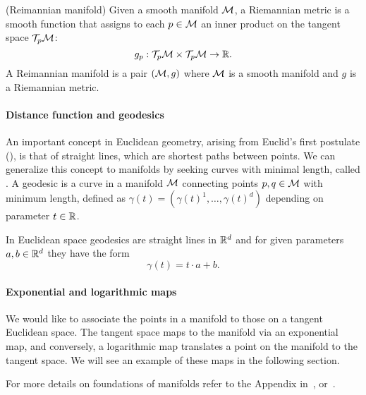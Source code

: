 \begin{definition} (Reimannian manifold)
Given a smooth manifold $\mathcal{M}$, a Riemannian metric is a smooth function that assigns to each $p \in \mathcal{M}$ an inner product on the tangent space $\mathcal{T}_p\mathcal{M}$:
\begin{equation*}
    g_p: \mathcal{T}_p\mathcal{M} \times \mathcal{T}_p\mathcal{M} \to \mathbb{R}.
\end{equation*}
    A Reimannian manifold is a pair $(\mathcal{M},g)$ where $\mathcal{M}$ is a smooth manifold and $g$ is a Riemannian metric.
\end{definition}



\paragraph{Distance function and geodesics} An important concept in Euclidean geometry, arising from Euclid's first postulate (), is that of straight lines, which are shortest paths between points. We can generalize this concept to manifolds by seeking curves with minimal length, called . A geodesic is a curve in a manifold $\mathcal{M}$ connecting points $p,q\in \mathcal{M}$ with minimum length, defined as $\gamma(t)=(\gamma(t)^1, \dots, \gamma(t)^d)$ depending on parameter $t\in \mathbb{R}$. 

In Euclidean space geodesics are straight lines in $\mathbb{R}^d$ and for given parameters $a,b\in \mathbb{R}^d$ they have the form 
\begin{equation}
    \gamma(t) = t\cdot a + b.
\end{equation}

\paragraph{Exponential and logarithmic maps} We would like to associate the points in a manifold to those on a tangent Euclidean space. The tangent space maps to the manifold via an exponential map, and conversely, a logarithmic map translates a point on the manifold to the tangent space. We will see an example of these maps in the following section.

For more details on foundations of manifolds refer to the Appendix in~\cite{Chami2021representationLearningAlgorithmsHyperbolicSpaces}, or~\cite{doCarmo1992riemannianGeometry}\cite{Lee2003smooth}.



